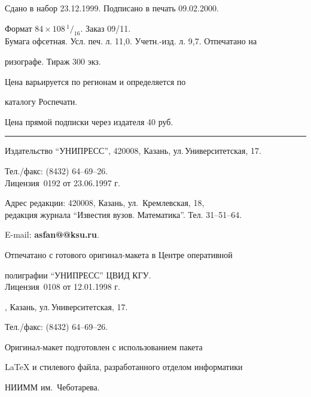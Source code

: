 \setlength{\hoffset}{-23mm}


\bigskip


\noindent Сдано в набор 23.12.1999. Подписано в печать 09.02.2000.


Формат $84\times 108 \,^1/_{16}.$ Заказ 09/11.\\


Бумага офсетная. Усл. печ. л. 11,0. Учетн.-изд. л. 9,7. Отпечатано на 


ризографе. Тираж 300 экз. 





\noindent Цена варьируется по регионам и определяется по 


каталогу Роспечати. 





\noindent Цена прямой подписки через издателя 40 руб. 


\bigskip


\hrule


\bigskip


\noindent Издательство ``УНИПРЕСС'', 420008, Казань, ул.\,Университетская, 17.


Тел./факс: (8432) 64--69--26.\\


Лицензия \No\,0192 от 23.06.1997 г.


\smallskip





\noindent Адрес редакции: 420008, Казань, ул.~Кремлевская, 18,\\  


редакция журнала  ``Известия вузов. Математика''. Тел. 31--51--64.





\noindent E-mail: {\bf asfan@@ksu.ru}. \par


\bigskip 


\noindent Отпечатано с готового оригинал-макета в Центре оперативной


полиграфии ``УНИПРЕСС'' ЦВИД КГУ. \\


Лицензия \No\,0108 от 12.01.1998 г.





, Казань, ул.\,Университетская, 17.


Тел./факс: (8432) 64--69--26. \par


\bigskip


\noindent Оригинал-макет подготовлен с использованием пакета


\AmS\LaTeX{} и стилевого файла, разработанного отделом информатики


НИИММ им.~Чеботарева.








